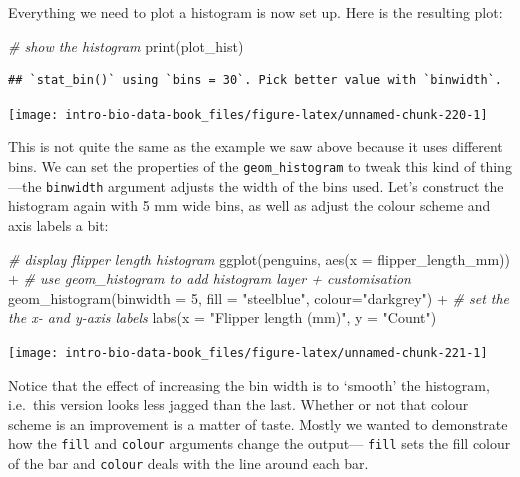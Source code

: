 \documentclass[
]{book}
\newenvironment{Shaded}{\begin{snugshade}}{\end{snugshade}}
\newcommand{\AttributeTok}[1]{\textcolor[rgb]{0.77,0.63,0.00}{#1}}
\newcommand{\CommentTok}[1]{\textcolor[rgb]{0.56,0.35,0.01}{\textit{#1}}}
\newcommand{\DecValTok}[1]{\textcolor[rgb]{0.00,0.00,0.81}{#1}}
\newcommand{\FunctionTok}[1]{\textcolor[rgb]{0.00,0.00,0.00}{#1}}
\newcommand{\NormalTok}[1]{#1}
\newcommand{\SpecialCharTok}[1]{\textcolor[rgb]{0.00,0.00,0.00}{#1}}
\newcommand{\StringTok}[1]{\textcolor[rgb]{0.31,0.60,0.02}{#1}}
\begin{document}
Everything we need to plot a histogram is now set up. Here is the resulting plot:

\begin{Shaded}
\begin{Highlighting}[]
\CommentTok{\# show the histogram}
\FunctionTok{print}\NormalTok{(plot\_hist)}
\end{Highlighting}
\end{Shaded}

\begin{verbatim}
## `stat_bin()` using `bins = 30`. Pick better value with `binwidth`.
\end{verbatim}

\begin{center}\texttt{[image: intro-bio-data-book\_files/figure-latex/unnamed-chunk-220-1]} \end{center}

This is not quite the same as the example we saw above because it uses different bins. We can set the properties of the \texttt{geom\_histogram} to tweak this kind of thing---the \texttt{binwidth} argument adjusts the width of the bins used. Let's construct the histogram again with 5 mm wide bins, as well as adjust the colour scheme and axis labels a bit:

\begin{Shaded}
\begin{Highlighting}[]
\CommentTok{\# display flipper length histogram}
\FunctionTok{ggplot}\NormalTok{(penguins, }\FunctionTok{aes}\NormalTok{(}\AttributeTok{x =}\NormalTok{ flipper\_length\_mm)) }\SpecialCharTok{+} 
  \CommentTok{\# use geom\_histogram to add histogram layer + customisation}
  \FunctionTok{geom\_histogram}\NormalTok{(}\AttributeTok{binwidth =} \DecValTok{5}\NormalTok{, }\AttributeTok{fill =} \StringTok{"steelblue"}\NormalTok{, }\AttributeTok{colour=}\StringTok{"darkgrey"}\NormalTok{) }\SpecialCharTok{+} 
  \CommentTok{\# set the the x{-} and y{-}axis labels}
  \FunctionTok{labs}\NormalTok{(}\AttributeTok{x =} \StringTok{"Flipper length (mm)"}\NormalTok{, }\AttributeTok{y =} \StringTok{"Count"}\NormalTok{)}
\end{Highlighting}
\end{Shaded}

\begin{center}\texttt{[image: intro-bio-data-book\_files/figure-latex/unnamed-chunk-221-1]} \end{center}

Notice that the effect of increasing the bin width is to `smooth' the histogram, i.e.~this version looks less jagged than the last. Whether or not that colour scheme is an improvement is a matter of taste. Mostly we wanted to demonstrate how the \texttt{fill} and \texttt{colour} arguments change the output--- \texttt{fill} sets the fill colour of the bar and \texttt{colour} deals with the line around each bar.
\end{document}
